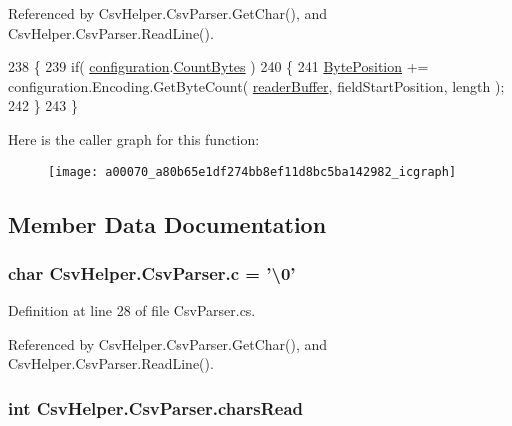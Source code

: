 Referenced by Csv\-Helper.\-Csv\-Parser.\-Get\-Char(), and Csv\-Helper.\-Csv\-Parser.\-Read\-Line().


\begin{DoxyCode}
238         \{
239             \textcolor{keywordflow}{if}( \hyperlink{a00070_aeb171813d1526839ccd41d60ab6483b2}{configuration}.\hyperlink{a00065_af774e3cb6d18788006deec71879f54a1}{CountBytes} )
240             \{
241                 \hyperlink{a00070_a6fd7255ce9ae33029aafcaab07205047}{BytePosition} += configuration.Encoding.GetByteCount( 
      \hyperlink{a00070_ad8b27f20be101a15ef390fcc37f8631b}{readerBuffer}, fieldStartPosition, length );
242             \}
243         \}
\end{DoxyCode}


Here is the caller graph for this function\-:
\nopagebreak
\begin{figure}[H]
\begin{center}
\leavevmode
\texttt{[image: a00070\_a80b65e1df274bb8ef11d8bc5ba142982\_icgraph]}
\end{center}
\end{figure}




\subsection{Member Data Documentation}
\hypertarget{a00070_ae56cb79868b308d55a44c4c4b7cd22d1}{
\subsubsection[{c}]{\setlength{\rightskip}{0pt plus 5cm}char Csv\-Helper.\-Csv\-Parser.\-c = '\textbackslash{}0'\hspace{0.3cm}{\ttfamily [private]}}}\label{a00070_ae56cb79868b308d55a44c4c4b7cd22d1}


Definition at line 28 of file Csv\-Parser.\-cs.



Referenced by Csv\-Helper.\-Csv\-Parser.\-Get\-Char(), and Csv\-Helper.\-Csv\-Parser.\-Read\-Line().

\hypertarget{a00070_a9300effd525a71c2a377bde2586da9ae}{
\subsubsection[{chars\-Read}]{\setlength{\rightskip}{0pt plus 5cm}int Csv\-Helper.\-Csv\-Parser.\-chars\-Read\hspace{0.3cm}{\ttfamily [private]}}}\label{a00070_a9300effd525a71c2a377bde2586da9ae}


